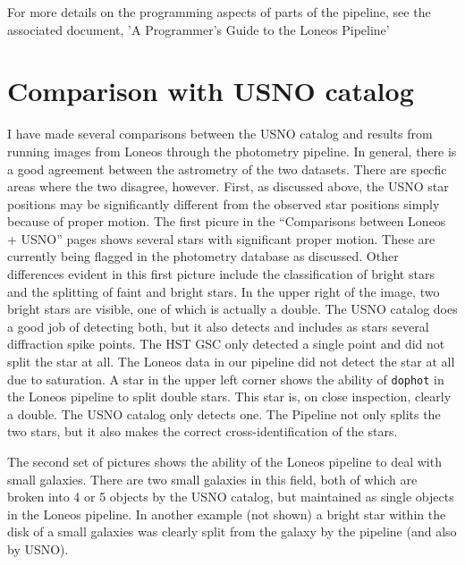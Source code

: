\documentclass{article}
\begin{document}
For more details on the programming aspects of parts of the pipeline,
see the associated document, 'A Programmer's Guide to the Loneos
Pipeline'

\section {Comparison with USNO catalog}

I have made several comparisons between the USNO catalog and results
from running images from Loneos through the photometry pipeline.  In
general, there is a good agreement between the astrometry of the two
datasets.  There are specfic areas where the two disagree, however.
First, as discussed above, the USNO star positions may be
significantly different from the observed star positions simply
because of proper motion.  The first picure in the ``Comparisons
between Loneos + USNO'' pages shows several stars with significant
proper motion.  These are currently being flagged in the photometry
database as discussed.  Other differences evident in this first
picture include the classification of bright stars and the splitting
of faint and bright stars.  In the upper right of the image, two
bright stars are visible, one of which is actually a double.  The USNO
catalog does a good job of detecting both, but it also detects and
includes as stars several diffraction spike points.  The HST GSC only
detected a single point and did not split the star at all.  The Loneos
data in our pipeline did not detect the star at all due to saturation.
A star in the upper left corner shows the ability of {\tt dophot} in
the Loneos pipeline to split double stars.  This star is, on close
inspection, clearly a double.  The USNO catalog only detects one.  The
Pipeline not only splits the two stars, but it also makes the correct
cross-identification of the stars.  

The second set of pictures shows the ability of the Loneos pipeline to
deal with small galaxies.  There are two small galaxies in this field,
both of which are broken into 4 or 5 objects by the USNO catalog, but
maintained as single objects in the Loneos pipeline.  In another
example (not shown) a bright star within the disk of a small galaxies
was clearly split from the galaxy by the pipeline (and also by USNO).

\appendix
\end{document}
